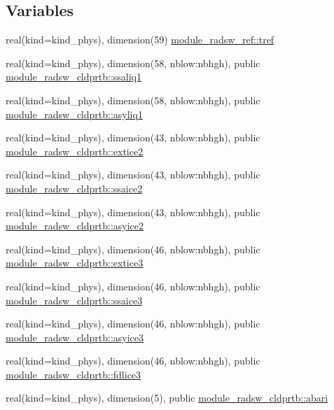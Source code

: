 \subsection*{Variables}
\begin{DoxyCompactItemize}
\item 
real(kind=kind\+\_\+phys), dimension(59) \hyperlink{group__module__radsw__main_ga449fffa7047caa0fba6c166c26f7dbbd}{module\+\_\+radsw\+\_\+ref\+::tref}
\item 
real(kind=kind\+\_\+phys), dimension(58, nblow\+:nbhgh), public \hyperlink{group__module__radsw__main_ga7944084ba9f240723dc93467ec66f825}{module\+\_\+radsw\+\_\+cldprtb\+::ssaliq1}
\item 
real(kind=kind\+\_\+phys), dimension(58, nblow\+:nbhgh), public \hyperlink{group__module__radsw__main_ga430be0720aa2e2ac46aa1ec7c9a9b64b}{module\+\_\+radsw\+\_\+cldprtb\+::asyliq1}
\item 
real(kind=kind\+\_\+phys), dimension(43, nblow\+:nbhgh), public \hyperlink{group__module__radsw__main_ga8ed403302034ea073243157749673e14}{module\+\_\+radsw\+\_\+cldprtb\+::extice2}
\item 
real(kind=kind\+\_\+phys), dimension(43, nblow\+:nbhgh), public \hyperlink{group__module__radsw__main_ga48555ff54d3a46f8c49733ff82e94d70}{module\+\_\+radsw\+\_\+cldprtb\+::ssaice2}
\item 
real(kind=kind\+\_\+phys), dimension(43, nblow\+:nbhgh), public \hyperlink{group__module__radsw__main_gad9328ffc5e90cc62c8c9c5089b55fc79}{module\+\_\+radsw\+\_\+cldprtb\+::asyice2}
\item 
real(kind=kind\+\_\+phys), dimension(46, nblow\+:nbhgh), public \hyperlink{group__module__radsw__main_ga8b8bae831aa5b460e260c94e7f24f4c7}{module\+\_\+radsw\+\_\+cldprtb\+::extice3}
\item 
real(kind=kind\+\_\+phys), dimension(46, nblow\+:nbhgh), public \hyperlink{group__module__radsw__main_ga39b045b05e6bc9c04603277654ff8fc6}{module\+\_\+radsw\+\_\+cldprtb\+::ssaice3}
\item 
real(kind=kind\+\_\+phys), dimension(46, nblow\+:nbhgh), public \hyperlink{group__module__radsw__main_gaec2685be0de3a557aca169062cf1055e}{module\+\_\+radsw\+\_\+cldprtb\+::asyice3}
\item 
real(kind=kind\+\_\+phys), dimension(46, nblow\+:nbhgh), public \hyperlink{group__module__radsw__main_gaa42cf6596d2dcd887864b1de40da3293}{module\+\_\+radsw\+\_\+cldprtb\+::fdlice3}
\item 
real(kind=kind\+\_\+phys), dimension(5), public \hyperlink{group__module__radsw__main_gace960bbbf15ab3cadbee76301ff111dd}{module\+\_\+radsw\+\_\+cldprtb\+::abari}

\end{DoxyCompactItemize}
